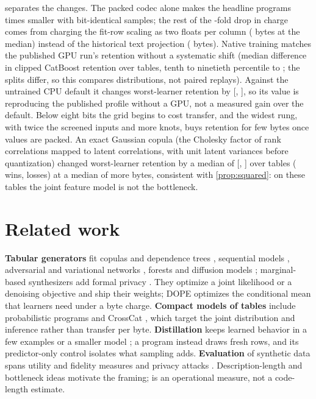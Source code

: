 \documentclass{article}
\theoremstyle{remark}
\begin{document}
 separates the changes. The packed codec alone makes the headline programs
\EbCodecFactor{} times smaller with bit-identical samples; the rest of the \EbByteFactor{}-fold drop in
charge comes from charging the fit-row scaling as two floats per column (\EbProjection{} bytes at the
median) instead of the historical text projection (\EbProjectionJson{} bytes). Native training matches the
published GPU run's retention without a systematic shift (median difference in clipped CatBoost retention
\EbParityCatboost{} over \EbParityCatboostN{} tables, tenth to ninetieth percentile \EbParityCatboostLo{} to
\EbParityCatboostHi{}; the splits differ, so this compares distributions, not paired replays). Against the untrained CPU default it changes worst-learner retention by \EbTrainedGain{}
[\EbTrainedGainLo, \EbTrainedGainHi], so its value is reproducing the published profile without a GPU,
not a measured gain over the default. Below eight bits the grid begins to cost transfer, and the widest rung, with twice the
screened inputs and more knots, buys retention for few bytes once values are packed. An exact Gaussian copula (the Cholesky
factor of rank correlations mapped to latent correlations, with unit latent variances before quantization)
changed worst-learner retention by a median of \EbCopulaDelta{} [\EbCopulaDeltaLo, \EbCopulaDeltaHi] over
\EbCopulaTables{} tables (\EbCopulaWins{} wins, \EbCopulaLosses{} losses) at a median of
\EbCopulaExtraBytes{} more bytes, consistent with \cref{prop:squared}: on these tables the joint feature
model is not the bottleneck.

\section{Related work}
\label{sec:related}

\textbf{Tabular generators} fit copulas and dependence trees \citep{patki2016sdv,chow1968dependence},
sequential models \citep{nowok2016synthpop}, adversarial and variational networks \citep{xu2019ctgan},
forests \citep{watson2023arf,jolicoeurmartineau2024forestdiffusion} and diffusion models
\citep{kotelnikov2023tabddpm,zhang2024tabsyn}; marginal-based synthesizers add formal privacy
\citep{zhang2014privbayes,mckenna2022aim}. They optimize a joint likelihood or a denoising objective and
ship their weights; DOPE optimizes the conditional mean that learners need under a byte charge.
\textbf{Compact models of tables} include probabilistic programs \citep{saad2019bayesian} and CrossCat
\citep{mansinghka2016crosscat}, which target the joint distribution and inference rather than transfer per
byte. \textbf{Distillation} keeps learned behavior in a few examples \citep{wang2018distillation} or a
smaller model \citep{hinton2015distilling}; a program instead draws fresh rows, and its predictor-only
control isolates what sampling adds. \textbf{Evaluation} of synthetic data spans utility and fidelity
measures \citep{alaa2022faithful,qian2023synthcity} and privacy attacks \citep{stadler2022groundhog}.
Description-length and bottleneck ideas \citep{rissanen1978modeling,tishby2000bottleneck} motivate the
framing; \MetricName{} is an operational measure, not a code-length estimate.
\end{document}
